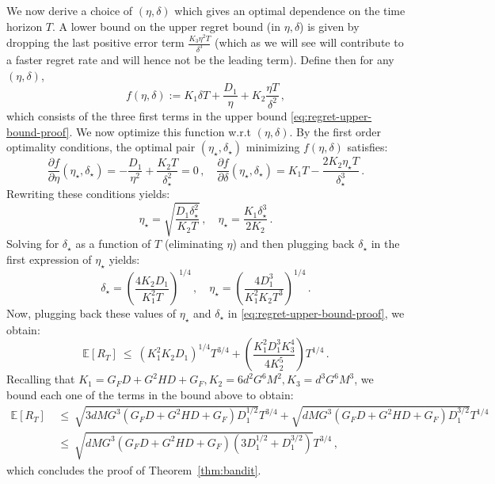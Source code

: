 \documentclass[a4paper,11pt,fullpage]{article}
\theoremstyle{plain}
\theoremstyle{definition}
\theoremstyle{plain}
\renewcommand{\leq}{~\le~}
\begin{document}
We now derive a choice of $(\eta, \delta)$ which gives an optimal dependence on the time horizon $T$. A lower bound on the upper regret bound (in $\eta, \delta$) is given by dropping the last positive error term $\frac{K_3 \eta^2 T}{\delta^3}$ (which as we will see will contribute to a faster regret rate and will hence not be the leading term). Define then for any $(\eta, \delta)$, 
\begin{equation*}
f(\eta, \delta) := K_1 \delta T  + \frac{D_1}{\eta} + K_2 \frac{\eta T}{\delta^2}\,, 
\end{equation*}
which consists of the three first terms in the upper bound \eqref{eq:regret-upper-bound-proof}. We now optimize this function w.r.t $(\eta, \delta)$. By the first order optimality conditions, the optimal pair $(\eta_{\star}, \delta_{\star})$ minimizing $f(\eta, \delta)$ satisfies: 
\begin{equation*}
\frac{\partial f}{\partial \eta} (\eta_{\star}, \delta_{\star}) = - \frac{D_1}{\eta^2} + \frac{K_2 T}{\delta_{\star}^2} = 0\,,\quad
\frac{\partial f}{\partial \delta} (\eta_{\star}, \delta_{\star}) 
= K_1 T - \frac{2 K_2 \eta_{\star} T}{\delta_{\star}^3}\,.
\end{equation*}
Rewriting these conditions yields: 
\begin{equation*}
\eta_{\star} = \sqrt{\frac{D_1 \delta_{\star}^2}{K_2 T}}\,, \quad \eta_{\star} = \frac{K_1 \delta_{\star}^3}{2 K_2}\,.
\end{equation*}
Solving for $\delta_{\star}$ as a function of $T$ (eliminating $\eta$) and then plugging back $\delta_{\star}$ in the first expression of $\eta_{\star}$ yields: 
\begin{equation*}
\delta_{\star} = \left(\frac{4 K_2 D_1}{K_1^2 T}\right)^{1/4}\,, \quad \eta_{\star} = \left(\frac{4 D_1^3}{K_1^2 K_2 T^3}\right)^{1/4}\,.
\end{equation*}
Now, plugging back these values of $\eta_{\star}$ and $\delta_{\star}$ in \eqref{eq:regret-upper-bound-proof}, we obtain: 
\begin{equation*}
\mathbb{E}[R_T] \leq (K_1^2 K_2D_1)^{1/4} T^{3/4} + \left(\frac{K_1^2 D_1^3 K_3^4}{4 K_2^5}\right) T^{1/4}\,.
\end{equation*}
Recalling that $K_1 = G_FD + G^2 HD + G_F, K_2 = 6 d^2 G^6 M^2, K_3 = d^3 G^6 M^3$, we bound each one of the terms in the bound above to obtain:
\begin{align}
\mathbb{E}[R_T] &\leq 
\sqrt{3 dM G^3 (G_FD + G^2 HD + G_F) D_1^{1/2}} T^{3/4}
+ \sqrt{dM G^3 (G_FD + G^2 HD + G_F) D_1^{3/2}} T^{1/4}\nonumber\\
&\leq \sqrt{dM G^3 (G_FD + G^2 HD + G_F) (3 D_1^{1/2} + D_1^{3/2})} T^{3/4} \,,
\end{align}
which concludes the proof of Theorem~\ref{thm:bandit}.
\end{document}
